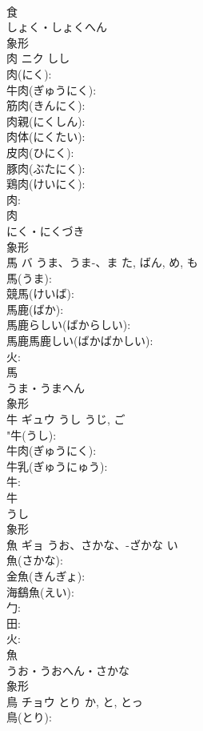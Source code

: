 \documentclass[8pt]{extreport}
\begin{document}
\begin{CJK}{UTF8}{min}
\\	食	
\\	しょく・しょくへん	
\\	象形 
\\	肉	ニク	しし		
\\	肉(にく): 
\\	牛肉(ぎゅうにく): 
\\	筋肉(きんにく): 
\\	肉親(にくしん): 
\\	肉体(にくたい): 
\\	皮肉(ひにく): 
\\	豚肉(ぶたにく): 
\\	鶏肉(けいにく): 
\\	肉: 
\\	肉	
\\	にく・にくづき	
\\	象形 
\\	馬	バ	うま、うま-、ま	た, ばん, め, も	
\\	馬(うま): 
\\	競馬(けいば): 
\\	馬鹿(ばか): 
\\	馬鹿らしい(ばからしい): 
\\	馬鹿馬鹿しい(ばかばかしい): 
\\	火: 
\\	馬	
\\	うま・うまへん	
\\	象形 
\\	牛	ギュウ	うし	うじ, ご	
\\	"牛(うし): 
\\	牛肉(ぎゅうにく): 
\\	牛乳(ぎゅうにゅう): 
\\	牛: 
\\	牛	
\\	うし	
\\	象形 
\\	魚	ギョ	うお、さかな、-ざかな	い	
\\	魚(さかな): 
\\	金魚(きんぎょ): 
\\	海鷂魚(えい): 
\\	勹: 
\\	田: 
\\	火: 
\\	魚	
\\	うお・うおへん・さかな	
\\	象形 
\\	鳥	チョウ	とり	か, と, とっ	
\\	鳥(とり): 

\end{CJK}
\end{document}
